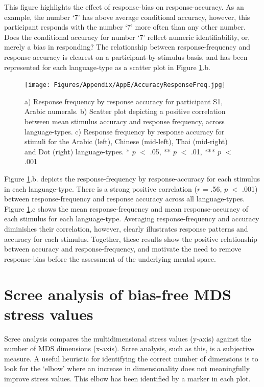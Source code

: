 This figure highlights the effect of response-bias on response-accuracy. As an example, the number `7' has above average conditional accuracy, however, this participant responds with the number `7' more often than any other number. Does the conditional accuracy for number `7' reflect numeric identifiability, or, merely a bias in responding? The relationship between response-frequency and response-accuracy is clearest on a participant-by-stimulus basis, and has been represented for each language-type as a scatter plot in Figure \ref{fig:AccRspFq_Cross}.b.


\begin{figure}[tbh]
\centering \texttt{[image: Figures/Appendix/AppE/AccuracyResponseFreq.jpg]}
\caption{a) Response frequency by response accuracy for participant S1, Arabic numerals. b) Scatter plot depicting a positive correlation between mean stimulus accuracy and response frequency, across language-types. c) Response frequency by response accuracy for stimuli for the Arabic (left), Chinese (mid-left), Thai (mid-right) and Dot (right) language-types. * $p$ $<$ .05, ** $p$ $<$ .01, *** $p$ $<$ .001}
\label{fig:AccRspFq_Cross}
\end{figure}

Figure \ref{fig:AccRspFq_Cross}.b. depicts the response-frequency by response-accuracy for each stimulus in each language-type. There is a strong positive correlation ($r$ = .56, $p$ $<$ .001) between response-frequency and response accuracy across all language-types. Figure \ref{fig:AccRspFq_Cross}.c shows the mean response-frequency and mean response-accuracy of each stimulus for each language-type. Averaging response-frequency and accuracy diminishes their correlation, however, clearly illustrates response patterns and accuracy for each stimulus. Together, these results show the positive relationship between accuracy and response-frequency, and motivate the need to remove response-bias before the assessment of the underlying mental space. 

\section{Scree analysis of bias-free MDS stress values} 
\label{Appendix:MDS}

Scree analysis compares the multidimensional stress values (y-axis) against the number of MDS dimensions (x-axis). Scree analysis, such as this, is a subjective measure. A useful heuristic for identifying the correct number of dimensions is to look for the `elbow' where an increase in dimensionality does not meaningfully improve stress values. This elbow has been identified by a marker in each plot.

